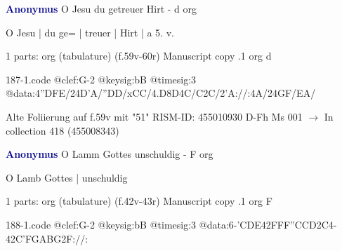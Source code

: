 \documentclass[twocolumn]{book}
\begin{document}
\newline \par \vspace{7pt} \textcolor{darkblue}{\textbf{Anonymus  }}
\newline O Jesu du getreuer Hirt - d
\newline org
\newline \begin{itshape}[f.59v, at left:] O Jesu | du ge= | treuer | Hirt | a 5. v.\end{itshape} 
\newline \textcolor{darkblue}{}  1 parts: org (tabulature)  (f.59v-60r)
\newline Manuscript copy
.1  org  d  
\begin{filecontents*}{187-1.code}
@clef:G-2
@keysig:bB
@timesig:3
@data:4''DFE/24D'A/''DD/xCC/4.D8D4C/C2C/2'A://:4A/24GF/EA/
\end{filecontents*}
\newline
%

\newline Alte Foliierung auf f.59v mit "51"
\newline RISM-ID: 455010930
\newline D-Fh  Ms 001
\newline $\rightarrow$ In collection 418 (455008343)
      
\newline \par \vspace{7pt} \textcolor{darkblue}{\textbf{Anonymus  }}
\newline O Lamm Gottes unschuldig - F
\newline org
\newline \begin{itshape}[f.42v, at left:] O Lamb Gottes | unschuldig\end{itshape} 
\newline \textcolor{darkblue}{}  1 parts: org (tabulature)  (f.42v-43r)
\newline Manuscript copy
.1  org  F  
\begin{filecontents*}{188-1.code}
@clef:G-2
@keysig:bB
@timesig:3
@data:6-{'CDE}42FFF''CCD2C4-42C'FGABG2F://:
\end{filecontents*}
\newline
%
\end{document}
